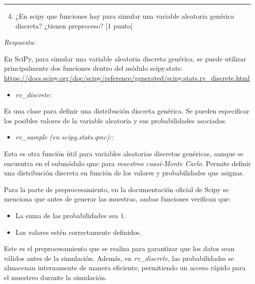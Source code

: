 \vspace{5mm}
{\color{lightgray} \hrule}
\begin{enumerate} \setcounter{enumi}{3}
	\item ¿En scipy que funciones hay para simular una variable aleatoria genérica discreta? ¿tienen preproceso? [1 punto]
\end{enumerate}

\textcolor{BrickRed}{\it Respuesta:}

En SciPy, para simular una variable aleatoria discreta genérica, se puede utilizar principalmente dos funciones dentro del módulo scipy.stats: \url{https://docs.scipy.org/doc/scipy/reference/generated/scipy.stats.rv\_discrete.html}

\begin{itemize}
	\item \textit{rv\_discrete:}
\end{itemize}	
	Es una clase para definir una distribución discreta genérica. Se pueden especificar los posibles valores de la variable aleatoria y sus probabilidades asociadas.
\begin{itemize}	
	\item \textit{rv\_sample (en scipy.stats.qmc)::}
\end{itemize}
Esta es otra función útil para variables aleatorias discretas genéricas, aunque se encuentra en el submódulo qmc para \textit{muestreo cuasi-Monte Carlo}. Permite definir una distribución discreta en función de los valores y probabilidades que asignas.

Para la parte de preprocesamiento, en la documentación oficial de Scipy se menciona que antes de generar las muestras, ambas funciones verifican que:
\begin{itemize}
	\item La suma de las probabilidades sea $1$.
	\item Los valores estén correctamente definidos.
\end{itemize}

Este es el preprocesamiento que se realiza para garantizar que los datos sean válidos antes de la simulación. Además, en \textit{rv\_discrete}, las probabilidades se almacenan internamente de manera eficiente, permitiendo un acceso rápido para el muestreo durante la simulación.